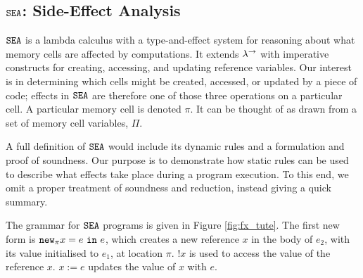 \subsection{$\mathtt{SEA}$: Side-Effect Analysis}

$\mathtt{SEA}$ is a lambda calculus with a type-and-effect system for reasoning about what memory cells are affected by computations. It extends $\lambda^{\rightarrow}$ with imperative constructs for creating, accessing, and updating reference variables. Our interest is in determining which cells might be created, accessed, or updated by a piece of code; effects in $\mathtt{SEA}$ are therefore one of those three operations on a particular cell. A particular memory cell is denoted $\pi$. It can be thought of as drawn from a set of memory cell variables, $\Pi$.

A full definition of $\mathtt{SEA}$ would include its dynamic rules and a formulation and proof of soundness. Our purpose is to demonstrate how static rules can be used to describe what effects take place during a program execution. To this end, we omit a proper treatment of soundness and reduction, instead giving a quick summary.

The grammar for $\mathtt{SEA}$ programs is given in Figure \ref{fig:fx_tute}. The first new form is $\mathtt{new}_{\pi} x = e~\mathtt{in}~ e$, which creates a new reference $x$ in the body of $e_2$, with its value initialised to $e_1$, at location $\pi$. $!x$ is used to access the value of the reference $x$. $x := e$ updates the value of $x$ with $e$.

